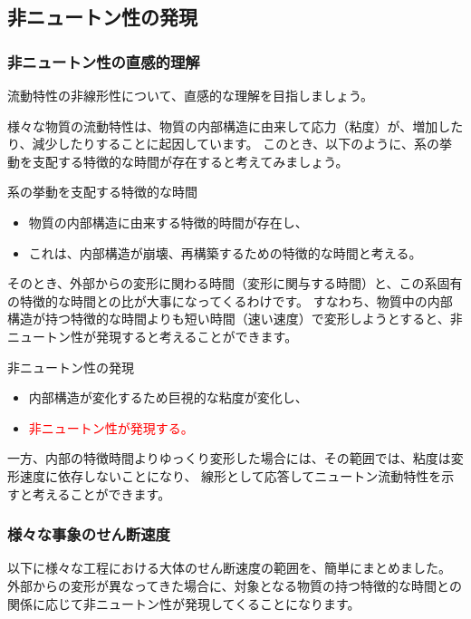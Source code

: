 \documentclass[uplatex,dvipdfmx,a4paper,11pt]{jsreport}
\begin{document}
\subsection{非ニュートン性の発現}
\subsubsection{非ニュートン性の直感的理解}
流動特性の非線形性について、直感的な理解を目指しましょう。

様々な物質の流動特性は、物質の内部構造に由来して応力（粘度）が、増加したり、減少したりすることに起因しています。
このとき、以下のように、系の挙動を支配する特徴的な時間が存在すると考えてみましょう。
\begin{itembox}[l]{系の挙動を支配する特徴的な時間}
	\begin{itemize}
		\item 物質の内部構造に由来する特徴的時間が存在し、
		\item これは、内部構造が崩壊、再構築するための特徴的な時間と考える。
	\end{itemize}
\end{itembox}

そのとき、外部からの変形に関わる時間（変形に関与する時間）と、この系固有の特徴的な時間との比が大事になってくるわけです。
すなわち、物質中の内部構造が持つ特徴的な時間よりも短い時間（速い速度）で変形しようとすると、非ニュートン性が発現すると考えることができます。
\begin{itembox}[l]{非ニュートン性の発現}
	\begin{itemize}
		\item 内部構造が変化するため巨視的な粘度が変化し、
		\item \textcolor{red}{非ニュートン性が発現する。}
	\end{itemize}
\end{itembox}

一方、内部の特徴時間よりゆっくり変形した場合には、その範囲では、粘度は変形速度に依存しないことになり、
線形として応答してニュートン流動特性を示すと考えることができます。

\subsubsection{様々な事象のせん断速度}
以下に様々な工程における大体のせん断速度の範囲を、簡単にまとめました。
外部からの変形が異なってきた場合に、対象となる物質の持つ特徴的な時間との関係に応じて非ニュートン性が発現してくることになります。
\end{document}
